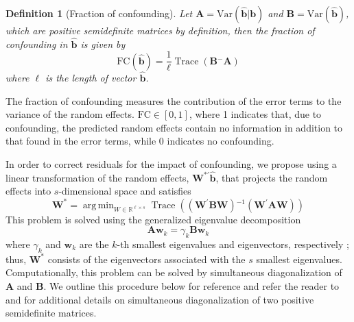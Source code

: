 \documentclass[12pt]{article} %
\newtheorem{definition}{Definition}
\newcommand{\inv}{\ensuremath{^{-1}}}
\newcommand{\ginv}{\ensuremath{^{-}}}
\newcommand{\trans}{\ensuremath{^\prime}}
\newcommand{\var}{\ensuremath{\mathrm{Var}}}
\DeclareMathOperator{\tr}{Trace}
\DeclareMathOperator*{\argmin}{arg\,min}
\begin{document}
\begin{definition}[Fraction of confounding]
Let $\bm{A} = \var(\widehat{\bm{b}} | \bm{b} )$ and $\bm{B} = \var(\widehat{\bm{b}})$, which are positive semidefinite matrices by definition, then the fraction of confounding in $\widehat{\bm{b}}$ is given by
%
\begin{equation}\label{eq:fc2}
\text{FC}(\widehat{\bm{b}}) = \frac{1}{\ell} \tr\left( \bm{B}\ginv\bm{A} \right)
\end{equation}
where $\ell$ is the length of vector $\widehat{\bm{b}}$.
\end{definition}
The fraction of confounding measures the contribution of the error terms  to the variance of the random effects. $\text{FC} \in [0,1]$, where 1 indicates that, due to confounding, the predicted random effects contain no information in addition to that found in the error terms, while 0 indicates no confounding. 


In order to correct residuals for the impact of confounding, we propose using a linear transformation of the random effects, $\bm{W}^{*\prime} \widehat{\bm{b}}$, that projects the random effects into $s$-dimensional space and satisfies
\begin{equation}\label{eq:minimize}
\bm{W}^* = \argmin_{W \in \mathbb{R}^{\ell \times s} } 
\tr\left( \left(\bm{W\trans B W} \right)\inv \left(\bm{W\trans A W}\right) \right)
\end{equation}
This problem is solved using the generalized eigenvalue decomposition
\begin{equation}\label{eq:geigen}
	\bm{Aw}_k = \gamma_k \bm{Bw}_k
\end{equation}
where $\gamma_k$ and $\bm{w}_k$ are the $k$-th smallest eigenvalues and eigenvectors, respectively \citep{Fukunaga:1990}; thus, $\bm{W}^*$ consists of the eigenvectors associated with the $s$ smallest eigenvalues. Computationally, this problem can be solved by simultaneous diagonalization of $\bm{A}$ and $\bm{B}$. We outline this procedure below for reference and refer the reader to \cite{McDonald:1979ca} and \cite{deLeeuw:1982to} for additional details on simultaneous diagonalization of two positive semidefinite matrices.\\
\end{document}
